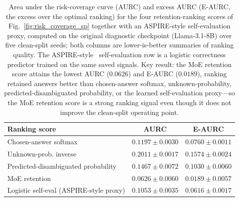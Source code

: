 \documentclass{ieeeaccess}
\begin{document}
\begin{table}[t]
\caption{Area under the risk-coverage curve (AURC) and excess AURC (E-AURC, the excess over the optimal ranking) for the four retention-ranking scores of Fig.~\ref{fig:risk_coverage_sp} together with an ASPIRE-style self-evaluation proxy, computed on the original diagnostic checkpoint (Llama-3.1-8B) over five clean-split seeds; both columns are lower-is-better summaries of ranking quality. The ASPIRE-style~\cite{chen2023aspire} self-evaluation row is a logistic correctness predictor trained on the same saved signals. Key result: the MoE retention score attains the lowest AURC ($0.0626$) and E-AURC ($0.0189$), ranking retained answers better than chosen-answer softmax, unknown-probability, predicted-disambiguated probability, or the learned self-evaluation proxy---so the MoE retention score is a strong ranking signal even though it does not improve the clean-split operating point.}
\label{tab:aurc}
\centering
\scriptsize
\setlength{\tabcolsep}{4pt}
\begin{tabular}{@{}lcc@{}}
\toprule
Ranking score & AURC & E-AURC \\
\midrule
Chosen-answer softmax & $0.1197\pm0.0030$ & $0.0760\pm0.0011$ \\
Unknown-prob. inverse & $0.2011\pm0.0017$ & $0.1574\pm0.0024$ \\
Predicted-disambiguated probability & $0.1467\pm0.0072$ & $0.1030\pm0.0060$ \\
MoE retention & $0.0626\pm0.0060$ & $0.0189\pm0.0057$ \\
Logistic self-eval (ASPIRE-style proxy) & $0.1053\pm0.0035$ & $0.0616\pm0.0017$ \\
\bottomrule
\end{tabular}
\end{table}
\end{document}
